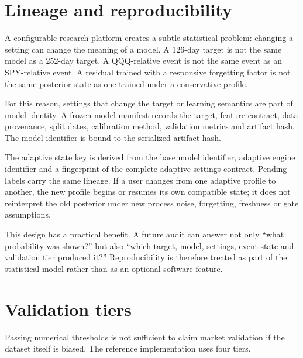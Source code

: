 \documentclass[11pt]{article}
\begin{document}
\section{Lineage and reproducibility}
\label{sec:lineage}

A configurable research platform creates a subtle statistical problem: changing a setting can change the meaning of a model. A 126-day target is not the same model as a 252-day target. A QQQ-relative event is not the same event as an SPY-relative event. A residual trained with a responsive forgetting factor is not the same posterior state as one trained under a conservative profile.

For this reason, settings that change the target or learning semantics are part of model identity. A frozen model manifest records the target, feature contract, data provenance, split dates, calibration method, validation metrics and artifact hash. The model identifier is bound to the serialized artifact hash.

The adaptive state key is derived from the base model identifier, adaptive engine identifier and a fingerprint of the complete adaptive settings contract. Pending labels carry the same lineage. If a user changes from one adaptive profile to another, the new profile begins or resumes its own compatible state; it does not reinterpret the old posterior under new process noise, forgetting, freshness or gate assumptions.

This design has a practical benefit. A future audit can answer not only ``what probability was shown?'' but also ``which target, model, settings, event state and validation tier produced it?'' Reproducibility is therefore treated as part of the statistical model rather than as an optional software feature.

\section{Validation tiers}
\label{sec:tiers}

Passing numerical thresholds is not sufficient to claim market validation if the dataset itself is biased. The reference implementation uses four tiers.
\end{document}
